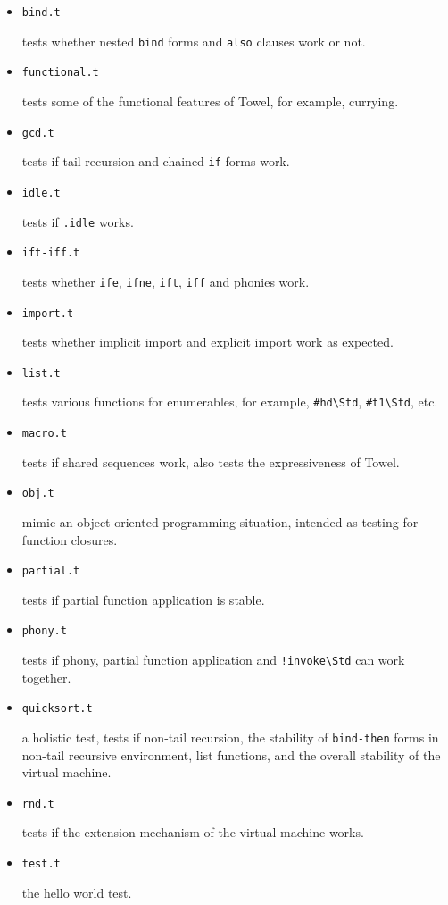 \documentclass{report}
\newcommand{\mstd}[1]{\texttt{#1\textbackslash Std}}
\begin{document}
\begin{itemize}
\item \texttt{bind.t}

tests whether nested \texttt{bind} forms and \texttt{also} clauses work or not.

\item \texttt{functional.t}

tests some of the functional features of Towel, for example, currying.

\item \texttt{gcd.t}

tests if tail recursion and chained \texttt{if} forms work.

\item \texttt{idle.t}

tests if \texttt{.idle} works.

\item \texttt{ift-iff.t}

tests whether \texttt{ife}, \texttt{ifne}, \texttt{ift}, \texttt{iff} and phonies work.

\item \texttt{import.t}

tests whether implicit import and explicit import work as expected.

\item \texttt{list.t}

tests various functions for enumerables, for example, \mstd{\#hd}, \mstd{\#t1}, etc.

\item \texttt{macro.t}

tests if shared sequences work, also tests the expressiveness of Towel.

\item \texttt{obj.t}

mimic an object-oriented programming situation, intended as testing for function closures.

\item \texttt{partial.t}

tests if partial function application is stable.

\item \texttt{phony.t}

tests if phony, partial function application and \mstd{!invoke} can work together.

\item \texttt{quicksort.t}

a holistic test, tests if non-tail recursion, the stability of \texttt{bind-then} forms in non-tail recursive environment, list functions, and the overall stability of the virtual machine.

\item \texttt{rnd.t}

tests if the extension mechanism of the virtual machine works.

\item \texttt{test.t}

the hello world test.

\end{itemize}
\end{document}
